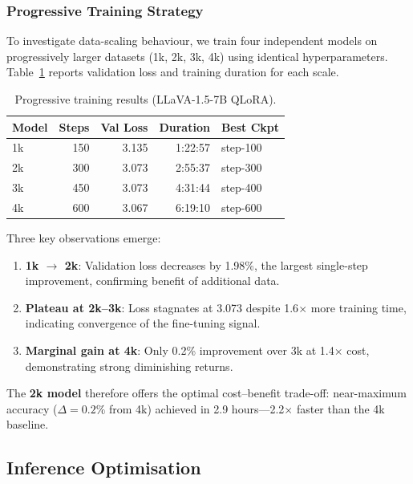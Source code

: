 \documentclass[twocolumn]{article}
\begin{document}
\subsubsection{Progressive Training Strategy}
\label{sec:progressive}

To investigate data-scaling behaviour, we train four independent models on
progressively larger datasets (1k, 2k, 3k, 4k) using identical hyperparameters.
Table~\ref{tab:training_results} reports validation loss and training duration
for each scale.

\begin{table}[h]
\centering
\caption{Progressive training results (LLaVA-1.5-7B QLoRA).}
\label{tab:training_results}
\begin{tabular}{lrrrl}
\toprule
\textbf{Model} & \textbf{Steps} & \textbf{Val Loss} & \textbf{Duration} & \textbf{Best Ckpt} \\
\midrule
1k & 150 & 3.135 & 1:22:57 & step-100 \\
2k & 300 & 3.073 & 2:55:37 & step-300 \\
3k & 450 & 3.073 & 4:31:44 & step-400 \\
4k & 600 & 3.067 & 6:19:10 & step-600 \\
\bottomrule
\end{tabular}
\end{table}

Three key observations emerge:
\begin{enumerate}[leftmargin=*,itemsep=1pt]
  \item \textbf{1k $\to$ 2k}: Validation loss decreases by 1.98\%,
        the largest single-step improvement, confirming benefit of additional data.
  \item \textbf{Plateau at 2k--3k}: Loss stagnates at 3.073 despite 1.6$\times$
        more training time, indicating convergence of the fine-tuning signal.
  \item \textbf{Marginal gain at 4k}: Only 0.2\% improvement over 3k at
        1.4$\times$ cost, demonstrating strong diminishing returns.
\end{enumerate}

The \textbf{2k model} therefore offers the optimal cost--benefit trade-off:
near-maximum accuracy ($\Delta = 0.2\%$ from 4k) achieved in 2.9 hours---2.2$\times$
faster than the 4k baseline.

\subsection{Inference Optimisation}
\label{sec:inference}
\end{document}

